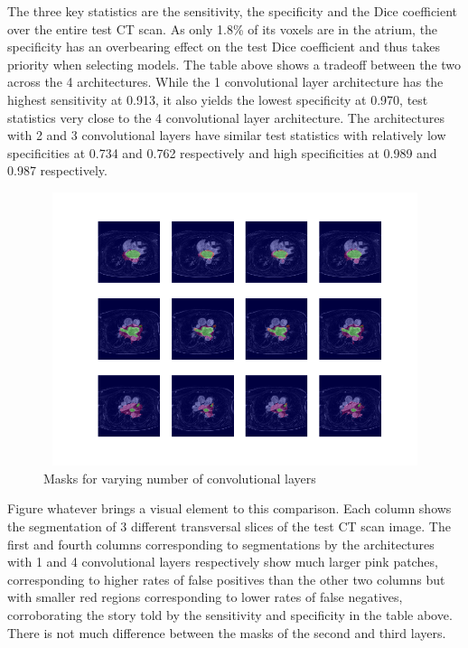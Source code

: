 \noindent The three key statistics are the sensitivity, the specificity and the Dice coefficient over the entire test CT scan. As only 1.8\% of its voxels are in the atrium, the specificity has an overbearing effect on the test Dice coefficient and thus takes priority when selecting models. The table above shows a tradeoff between the two across the 4 architectures. While the 1 convolutional layer architecture has the highest sensitivity at 0.913, it also yields the lowest specificity at 0.970, test statistics very close to the 4 convolutional layer architecture. The architectures with 2 and 3 convolutional layers have similar test statistics with relatively low specificities at 0.734 and 0.762 respectively and high specificities at 0.989 and 0.987 respectively.\\

\begin{figure}
\centering
\includegraphics[trim=2.5cm 1.5cm 2cm 1.5cm, clip=true, height=80mm, width=150mm]{Chapter3/mask_results_varying_number_of_convolutional_layers.png}
\caption{Masks for varying number of convolutional layers}
\end{figure}

\noindent Figure whatever brings a visual element to this comparison. Each column shows the segmentation of 3 different transversal slices of the test CT scan image. The first and fourth columns corresponding to segmentations by the architectures with 1 and 4 convolutional layers respectively show much larger pink patches, corresponding to higher rates of false positives than the other two columns but with smaller red regions corresponding to lower rates of false negatives, corroborating the story told by the sensitivity and specificity in the table above. There is not much difference between the masks of the second and third layers.\\

